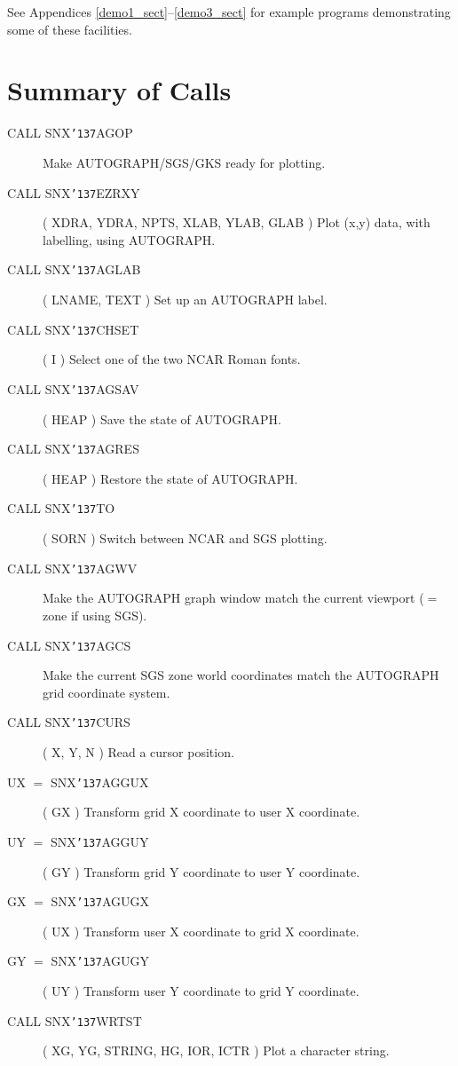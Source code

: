 \documentclass[11pt]{article}
\renewcommand{\_}{{\tt\char'137}}     %
\begin{document}
See Appendices \ref{demo1_sect}--\ref{demo3_sect} for example programs
demonstrating some of these facilities.


\section {Summary of Calls}

\begin{small}
\begin{description}
\item [CALL SNX\_AGOP] \hfill
\subitem Make AUTOGRAPH/SGS/GKS ready for plotting.
\indexspace
\item [CALL SNX\_EZRXY] ( XDRA, YDRA, NPTS, XLAB, YLAB, GLAB )
\subitem Plot (x,y) data, with labelling, using AUTOGRAPH.
\indexspace
\item [CALL SNX\_AGLAB] ( LNAME, TEXT )
\subitem Set up an AUTOGRAPH label.
\indexspace
\item [CALL SNX\_CHSET] ( I )
\subitem Select one of the two NCAR Roman fonts.
\indexspace
\item [CALL SNX\_AGSAV] ( HEAP )
\subitem Save the state of AUTOGRAPH.
\indexspace
\item [CALL SNX\_AGRES] ( HEAP )
\subitem Restore the state of AUTOGRAPH.
\indexspace
\item [CALL SNX\_TO] ( SORN )
\subitem Switch between NCAR and SGS plotting.
\indexspace
\item [CALL SNX\_AGWV] \hfill
\subitem Make the AUTOGRAPH graph window match the current viewport ($=$ zone
if using SGS).
\indexspace
\item [CALL SNX\_AGCS] \hfill
\subitem Make the current SGS zone world coordinates match the AUTOGRAPH grid
coordinate system.
\indexspace
\item [CALL SNX\_CURS] ( X, Y, N )
\subitem Read a cursor position.
\indexspace
\item [UX $=$ SNX\_AGGUX] ( GX )
\subitem Transform grid X coordinate to user X coordinate.
\indexspace
\item [UY $=$ SNX\_AGGUY] ( GY )
\subitem Transform grid Y coordinate to user Y coordinate.
\indexspace
\item [GX $=$ SNX\_AGUGX] ( UX )
\subitem Transform user X coordinate to grid X coordinate.
\indexspace
\item [GY $=$ SNX\_AGUGY] ( UY )
\subitem Transform user Y coordinate to grid Y coordinate.
\indexspace
\item [CALL SNX\_WRTST] ( XG, YG, STRING, HG, IOR, ICTR )
\subitem Plot a character string.
\end{description}
\end{small}
\end{document}
